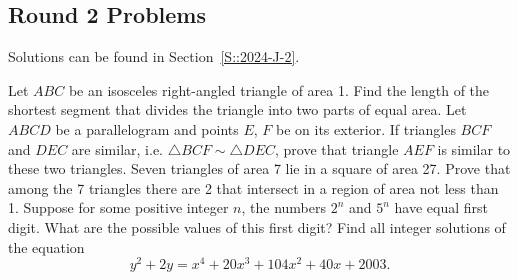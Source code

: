\subsection{Round 2 Problems}

Solutions can be found in Section~\ref{S::2024-J-2}.

\begin{enumerate}
    \hyperrefitem[Q::2024-J-2-1] Let $ABC$ be an isosceles right-angled triangle of area 1. Find the length of the shortest segment that divides the triangle into two parts of equal area.
    \hyperrefitem[Q::2024-J-2-2] Let $ABCD$ be a parallelogram and points $E$, $F$ be on its exterior. If triangles $BCF$ and $DEC$ are similar, i.e. $\triangle BCF \sim \triangle DEC$, prove that triangle $AEF$ is similar to these two triangles.
    \hyperrefitem[Q::2024-J-2-3] Seven triangles of area 7 lie in a square of area 27. Prove that among the 7 triangles there are 2 that intersect in a region of area not less than 1.
    \hyperrefitem[Q::2024-J-2-4] Suppose for some positive integer $n$, the numbers $2^n$ and $5^n$ have equal first digit. What are the possible values of this first digit?
    \hyperrefitem[Q::2024-J-2-5] Find all integer solutions of the equation \[y^2 + 2y = x^4 + 20x^3 + 104x^2 + 40x + 2003.\]
\end{enumerate}